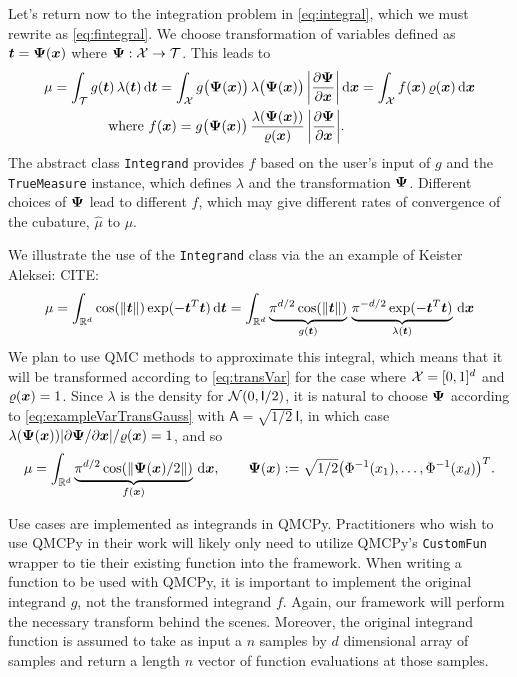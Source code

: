 \documentclass[graybox,footinfo]{svmult}
\newcommand{\QMCPYabs}[1]{\ensuremath{{\left \lvert #1 \right \rvert}}}
\newcommand{\AGSComment}[1]{{\color{cyan} Aleksei: #1}}
\newcommand{\hmu}{\widehat{\mu}}
\newcommand{\mA}{\mathsf{A}}
\newcommand{\mI}{\mathsf{I}}
\begin{document}
Let's return now to the integration problem in \eqref{eq:integral}, which we must rewrite as \eqref{eq:fintegral}.  We choose transformation of variables defined as ${\boldsymbol{t}} = {\boldsymbol{\Psi}}({\boldsymbol{x}})$ where ${\boldsymbol{\Psi}}:{\mathcal{X}} \to {\mathcal{T}}$.  This leads to 
\begin{align}
	\nonumber 
 \mu &= \int_\calT g(\bst) \, \lambda(\bst) \, \D \bst  = \int_\calX g\bigl(\bsPsi(\bsx)\bigr) \, \lambda\bigl(\bsPsi(\bsx)\bigr) \,\QMCPYabs{\frac{\partial \bsPsi}{\partial \bsx}} \, \D \bsx =  \int_\calX f(\bsx) \, \varrho(\bsx) \, \D \bsx  \\
 \label{eq:transVar}
  & \qquad \qquad \text{where } f(\bsx)  = g\bigl(\bsPsi(\bsx)\bigr)  \, \frac{\lambda(\bsPsi(\bsx))}{\varrho(\bsx)} \,\QMCPYabs{\frac{\partial \bsPsi}{\partial \bsx}}.
\end{align}
The abstract class \texttt{Integrand} provides $f$ based on the user's input of $g$ and the \texttt{TrueMeasure} instance, which defines $\lambda$ and the transformation ${\boldsymbol{\Psi}}$.  Different choices of ${\boldsymbol{\Psi}}$ lead to different $f$, which may give different rates of convergence of the cubature, $\hmu$ to $\mu$.  

We illustrate the use of the \texttt{Integrand} class via the an example of Keister \AGSComment{CITE}:
\begin{equation*}
	\mu 
	= \int_{\mathbb{R}^d} \cos(\lVert {\boldsymbol{t}} \rVert) \exp(-{\boldsymbol{t}}^T {\boldsymbol{t}}) \, \mathrm{d} {\boldsymbol{t}} \\ 
	= \int_{\mathbb{R}^d} \underbrace{\pi^{d/2} \cos(\lVert {\boldsymbol{t}} \rVert)}_{g({\boldsymbol{t}})}\, \underbrace{\pi^{-d/2} \exp(-{\boldsymbol{t}}^T {\boldsymbol{t}}) }_{\lambda({\boldsymbol{t}})} \, \mathrm{d} {\boldsymbol{x}}
\end{equation*}
We plan to use QMC methods to approximate this integral, which means that it will be transformed according to \eqref{eq:transVar} for the case where ${\mathcal{X}} = [0,1]^d$ and $\varrho({\boldsymbol{x}}) = 1$.  Since $\lambda$ is the density for $\calN(0,\mI/2)$, it is natural to choose ${\boldsymbol{\Psi}}$ according to \eqref{eq:exampleVarTransGauss} with $\mA = \sqrt{1/2} \, \mI$, in which case $\lambda(\bsPsi(\bsx)) \QMCPYabs{\partial \bsPsi/\partial \bsx} / \varrho(\bsx) = 1$, and so 
\[
\mu = \int_{\mathbb{R}^d} \underbrace{\pi^{d/2} \cos(\lVert {\boldsymbol{\Psi}}({\boldsymbol{x}})/2 \rVert)}_{f({\boldsymbol{x}})} \, \mathrm{d} {\boldsymbol{x}}, \qquad 
{\boldsymbol{\Psi}}({\boldsymbol{x}}) := \sqrt{1/2}\bigl(\Phi^{-1}(x_1),  \ldots, \Phi^{-1}(x_d)\bigr)^T .
\]


Use cases are implemented as integrands in QMCPy. Practitioners who wish to use QMCPy in their work will likely only need to utilize QMCPy's \texttt{CustomFun} wrapper to tie their existing function into the framework. When writing a function to be used with QMCPy, it is important to implement the original integrand $g$, not the transformed integrand $f$. Again, our framework will perform the necessary transform behind the scenes. Moreover, the original integrand function is assumed to take as input a $n$ samples by $d$ dimensional array of samples and return a length $n$ vector of function evaluations at those samples. 
\end{document}
